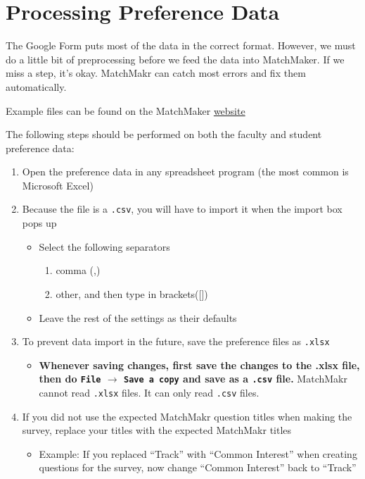 \chapter{Processing Preference Data}

The Google Form puts most of the data in the correct format.  However, we must do a little bit of preprocessing before we feed the data into MatchMaker.  If we miss a step, it's okay.  MatchMakr can catch most errors and fix them automatically.

Example files can be found on the MatchMaker \href{\website}{website}

The following steps should be performed on both the faculty and student preference data:
\begin{enumerate}
	\item Open the preference data in any spreadsheet program (the most common is Microsoft Excel)
	\item Because the file is a \texttt{.csv}, you will have to import it when the import box pops up
		\begin{itemize}
			\item Select the following separators
				\begin{enumerate}
					\item comma (,)
					\item other, and then type in brackets([])
				\end{enumerate}
			\item Leave the rest of the settings as their defaults
		\end{itemize}
	\item To prevent data import in the future, save the preference files as \texttt{.xlsx}
		\begin{itemize}
			\item \textbf{ Whenever saving changes, first save the changes to the .xlsx file, then do \texttt{File} $\rightarrow$ \texttt{Save a copy} and save as a \texttt{.csv} file.}  MatchMakr cannot read \texttt{.xlsx} files.  It can only read \texttt{.csv} files.
		\end{itemize}
	\item If you did not use the expected MatchMakr question titles when making the survey, replace your titles with the expected MatchMakr titles
		\begin{itemize}
			\item Example: If you replaced ``Track'' with ``Common Interest'' when creating questions for the survey, now change ``Common Interest'' back to ``Track''

\end{itemize}
\end{enumerate}

